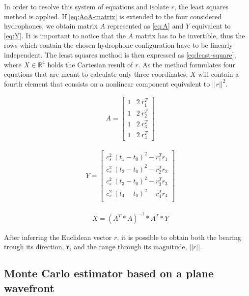 In order to resolve this system of equations and isolate $r$, the least squares method is applied. If \ref{eq:AoA-matrix} is extended to the four considered hydrophones, we obtain matrix $A$ represented as \ref{eq:A} and $Y$ equivalent to \ref{eq:Y}. It is important to notice that the $A$ matrix has to be invertible, thus the rows which contain the chosen hydrophone configuration have to be linearly independent. The least squares method is then expressed as \ref{eq:least-square}, where $X \in \mathbb{R}^{4}$ holds the Cartesian result of $r$. As the method formulates four equations that are meant to calculate only three coordinates, $X$ will contain a fourth element that consists on a nonlinear component equivalent to $||r||^{2}$.

\begin{eqnarray}
	& A = 
	\begin{bmatrix}
		1 & 2\: r_1^{T}\\
		1 & 2\: r_2^{T}\\
		1 & 2\: r_3^{T}\\
		1 & 2\: r_4^{T}
	\end{bmatrix}
	\label{eq:A}
\end{eqnarray}

\begin{eqnarray}
	& Y = 
	\begin{bmatrix}
		c_s^{2}\: (t_1-t_0)^2 - r_1^{T} r_1\\
		c_s^{2}\: (t_2-t_0)^2 - r_2^{T} r_2\\
		c_s^{2}\: (t_3-t_0)^2 - r_3^{T} r_3\\
		c_s^{2}\: (t_4-t_0)^2 - r_4^{T} r_4\\
	\end{bmatrix}
	\label{eq:Y}
\end{eqnarray}

\begin{eqnarray}
	& X = (A^{T}*A)^{-1}*A^{T}*Y
	\label{eq:least-square}
\end{eqnarray}

After inferring the Euclidean vector $r$, it is possible to obtain both the bearing trough its direction, $\hat{\boldsymbol{r}}$, and the range through its magnitude, $||r||$.

\subsection{Monte Carlo estimator based on a plane wavefront}

